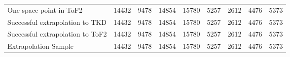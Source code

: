 \begin{landscape}
\begin{table}
\begin{tabular}[pos]{l|cccccccc}
One space point in ToF2                            &   14432  &    9478  &   14854  &   15780  &    5257  &    2612  &    4476  &    5373  \\
Successful extrapolation to TKD                    &   14432  &    9478  &   14854  &   15780  &    5257  &    2612  &    4476  &    5373  \\
Successful extrapolation to ToF2                   &   14432  &    9478  &   14854  &   15780  &    5257  &    2612  &    4476  &    5373  \\
\hline                                            
Extrapolation Sample                               &   14432  &    9478  &   14854  &   15780  &    5257  &    2612  &    4476  &    5373  \\
\hline                                            

\end{tabular}
\end{table}
\end{landscape}

